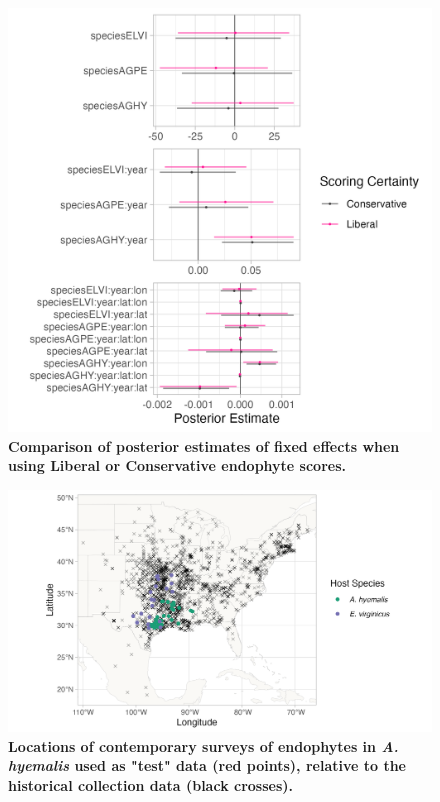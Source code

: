 \documentclass[11pt]{article}
\begin{document}
\begin{figure}[H]
	\centering
	\includegraphics[width = \linewidth]{fixed_plot.png}
	\caption{\textbf{Comparison of posterior estimates of fixed effects when using Liberal or Conservative endophyte scores.}}
\end{figure}

\begin{figure}[H]
	\centering
	\includegraphics[width = \linewidth]{../Plots/contemp_surveys_map.png}
	\caption{\textbf{Locations of contemporary surveys of endophytes in \emph{A. hyemalis} used as "test" data (red points), relative to the historical collection data (black crosses).}}
	\label{fig:contempsurveysmap}
\end{figure}
\end{document}
